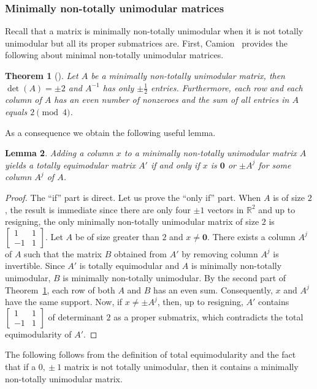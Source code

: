 \documentclass[11pt,a4paper]{amsart}
\theoremstyle{plain}
\newtheorem{theorem}{Theorem}[section]%
\newtheorem{lemma}[theorem]{Lemma}
\theoremstyle{definition}
\newcommand{\R}{\mathbb{R}}
\begin{document}
\subsubsection{Minimally non-totally unimodular matrices}
Recall that a matrix is minimally non-totally unimodular when it is not totally unimodular but all its proper submatrices are.
First, Camion~\cite{Camion_1965} provides the following about minimal non-totally unimodular matrices.
\begin{theorem}[\cite{Camion_1965}]\label{theorem:camion}
Let $A$ be a minimally non-totally unimodular matrix, then $\det (A)=\pm 2$ and $A^{-1}$ has only $\pm\frac{1}{2}$ entries.
Furthermore, each row and each column of $A$ has an even number of nonzeroes and the sum of all entries in $A$ equals $2\pmod{4}$.
\end{theorem}
As a consequence we obtain the following useful lemma.
\begin{lemma}\label{lemma:adding_column_to_min-nonTU}
Adding a column $x$ to a minimally non-totally unimodular matrix $A$ yields a totally equimodular matrix $A'$ if and only if $x$ is $\mathbf{0}$ or $\pm A^j$ for some column $A^j$ of $A$.
\end{lemma}
\begin{proof}
The ``if'' part is direct.
Let us prove the ``only if'' part.
When $A$ is of size $2$, the result is immediate since there are only four $\pm 1$ vectors in $\R^2$ and up to resigning, the only minimally non-totally unimodular matrix of size $2$ is $\begin{bmatrix}
1&1\\-1&1
\end{bmatrix}$.
Let $A$ be of size greater than $2$ and $x\neq\mathbf{0}$.
There exists a column $A^j$ of $A$ such that the matrix $B$ obtained from $A'$ by removing column $A^j$ is invertible.
Since $A'$ is totally equimodular and $A$ is minimally non-totally unimodular, $B$ is minimally non-totally unimodular.
By the second part of Theorem~\ref{theorem:camion}, each row of both $A$ and $B$ has an even sum. Consequently, $x$ and $A^j$ have the same support.
Now, if $x\neq\pm A^j$, then, up to resigning, $A'$ contains 
$\begin{bmatrix}
1&1\\-1&1
\end{bmatrix}$ of determinant $2$ as a proper submatrix, which contradicts the total equimodularity of $A'$.		
\end{proof}
The following follows from the definition of total equimodularity and the fact that if a $0,\!\pm1$ matrix is not totally unimodular, then it contains a minimally non-totally unimodular matrix.
\end{document}
